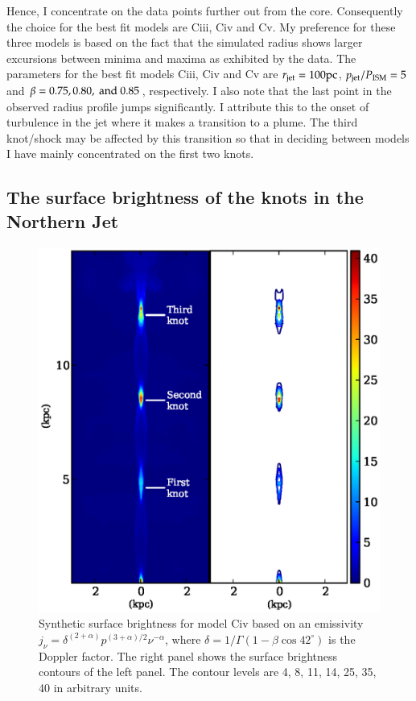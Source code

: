 Hence, I concentrate on the data points further out from the core. Consequently the choice for the best fit models are Ciii, Civ and Cv. My preference for these three models is based on the fact that the simulated radius shows larger excursions between minima and maxima as exhibited by the data. The parameters for the best fit models Ciii, Civ and Cv are $r_{\rm jet} = 100 \rm pc$, $p_{\rm jet}/P_{\rm ISM} = 5$ and $\beta = 0.75, 0.80, \rm \ and \ 0.85$, respectively. I also note that the last point in the observed radius profile jumps significantly. I attribute this to the onset of turbulence in the jet where it makes a transition to a plume. The third knot/shock may be affected by this transition so that in deciding between models I have mainly concentrated on the first two knots. 

%
%
\subsection{The surface brightness of the knots in the Northern Jet}
\label{s:knot}

\begin{figure}
\centering
\includegraphics[width=\linewidth]{csb.eps}
\caption{Synthetic surface brightness for model Civ based on an emissivity $j_{\nu} = \delta^{(2+\alpha)} p^{(3+\alpha)/2} \nu^{-\alpha}$, where $\delta= 1/\Gamma(1-\beta \cos 42^\circ)$ is the Doppler factor. The right panel shows the surface brightness contours of the left panel. The contour levels are 4, 8, 11, 14, 25, 35, 40 in arbitrary units.}
\label{radio_morphology}
\end{figure}


